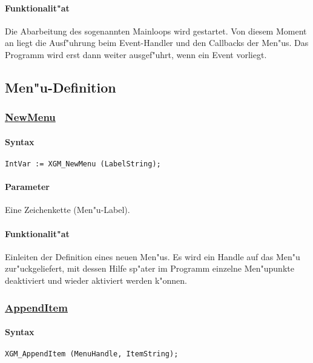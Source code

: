 \paragraph{Funktionalit"at}
Die Abarbeitung des sogenannten Mainloops wird gestartet. Von diesem Moment
an liegt die Ausf"uhrung beim Event-Handler und den Callbacks der Men"us.
Das Programm wird erst dann weiter ausgef"uhrt, wenn ein Event vorliegt.



\subsection{Men"u-Definition\label{XGM}}


\subsubsection{\underline{NewMenu}}

\paragraph{Syntax}
\begin{verbatim}
IntVar := XGM_NewMenu (LabelString);
\end{verbatim}


\paragraph{Parameter}
Eine Zeichenkette (Men"u-Label).


\paragraph{Funktionalit"at}
Einleiten der Definition eines neuen Men"us. Es wird ein Handle auf das Men"u
zur"uckgeliefert, mit dessen Hilfe sp"ater im Programm einzelne Men"upunkte
deaktiviert und wieder aktiviert werden k"onnen.

\subsubsection{\underline{AppendItem}}

\paragraph{Syntax}
\begin{verbatim}
XGM_AppendItem (MenuHandle, ItemString);
\end{verbatim}

